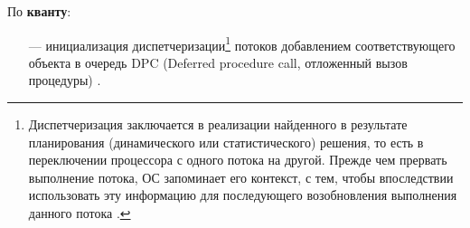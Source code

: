 По \textbf{кванту}:

\begin{itemize}
    \item[---] инициализация диспетчеризации\footnote{Диспетчеризация заключается в реализации найденного в результате планирования (динамического или статистического) решения, то есть в переключении процессора с одного потока на другой. Прежде чем прервать выполнение потока, ОС запоминает его контекст, с тем, чтобы впоследствии использовать эту информацию для последующего возобновления выполнения данного потока \cite{disp}.} потоков добавлением соответствующего объекта в очередь DPC (Deferred procedure call, отложенный вызов процедуры) \cite{win1}.
\end{itemize}